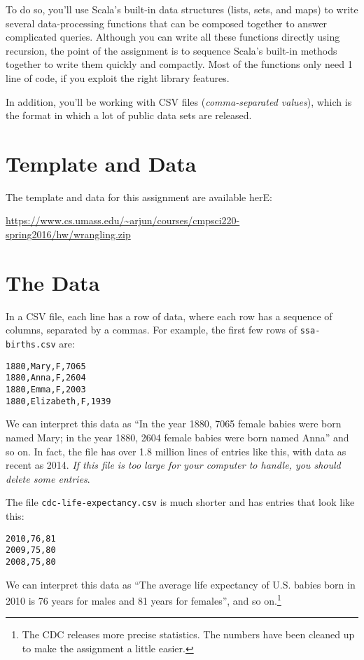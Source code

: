 \documentclass{book}
\begin{document}
To do so, you'll use Scala's built-in data
structures (lists, sets, and maps) to write several data-processing functions
that can be composed together to answer complicated queries.
Although you can write all these functions directly using recursion,
the point of the assignment is to sequence Scala's built-in methods together
to write them quickly and compactly. Most of the functions only need
1 line of code, if you exploit the right library features.

In addition, you'll be working with CSV files (\emph{comma-separated values}),
which is the format in which a lot of public data sets are released.

\section{Template and Data}

The template and data for this assignment are available herE:

\url{https://www.cs.umass.edu/~arjun/courses/cmpsci220-spring2016/hw/wrangling.zip}

\section{The Data}

In a CSV file, each line has a row of data, where each row
has a sequence of columns, separated by a commas. For example, the
first few rows of \texttt{ssa-births.csv} are:

\begin{verbatim}
1880,Mary,F,7065
1880,Anna,F,2604
1880,Emma,F,2003
1880,Elizabeth,F,1939
\end{verbatim}

We can interpret this data as ``In the year 1880, 7065 female babies were born
named Mary; in the year 1880, 2604 female babies were born named Anna'' and so on.
In fact, the file has over 1.8 million lines of entries like this, with data
as recent as 2014. \emph{If this file is too large for your computer to handle,
you should delete some entries}.

The file \texttt{cdc-life-expectancy.csv} is much shorter and has entries
that look like this:

\begin{verbatim}
2010,76,81
2009,75,80
2008,75,80
\end{verbatim}

We can interpret this data as ``The average life expectancy of U.S. babies born
in 2010 is 76 years for males and 81 years for females'', and so
on.\footnote{The CDC releases more precise statistics. The numbers have been
cleaned up to make the assignment a little easier.}
\end{document}
